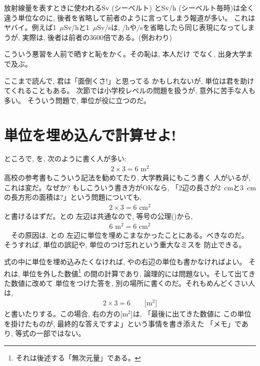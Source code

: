 \begin{exmpl} 放射線量を表すときに使われるSv (シーベルト)
とSv/h (シーベルト毎時)は全く違う単位なのに, 
後者を省略して前者のように言ってしまう報道が多い。
これはヤバイ。例えば1~$\mu$Sv/hと1~$\mu$Sv/sは, 
/hや/sを省略したら同じ表現になってしまうが, 実際は, 
後者は前者の3600倍である。(例おわり)\end{exmpl}\mv

こういう悪習を人前で晒すと恥をかく。その恥は, 本人だけ
でなく, 出身大学まで及ぶ。

ここまで読んで, 君は「面倒くさ!」と思ってる
かもしれないが, 単位は君を助けてくれることもある。
次節では小学校レベルの問題を扱うが, 意外に苦手な人も多い。
そういう問題で, 単位が役に立つのだ。\\

\section{単位を埋め込んで計算せよ!}
ところで, を, 次のように書く人が多い:
\begin{eqnarray}
2\times3=6\text{  m}^2\label{eq:rect_area00_NG}
\end{eqnarray}
高校の参考書もこういう記法を勧めてたり, 大学教員にもこう書く
人がいるが, これは変だ。なぜか? もしこういう書き方がOKなら, 
「2辺の長さが2~cmと3~cmの長方形の面積は?」という問題についても, 
\begin{eqnarray}
2\times3=6\text{  cm}^2\label{eq:rect_area00_NG2}
\end{eqnarray}
と書けるはずだ。との
左辺は共通なので, 等号の公理()から, 
\begin{eqnarray}
6\text{  m}^2=6\text{  cm}^2\label{eq:rect_area00_NG3}
\end{eqnarray}
　その原因は, 
との
左辺に単位を埋めこまなかったことにある。べきなのだ。
そうすれば, 単位の誤記や, 単位のつけ忘れという重大なミスを
防止できる。\mv

式の中に単位を埋め込みたくなければ, 
やの右辺の単位も書かなければよい。
それは, 単位を外した数値\footnote{それは後述する「無次元量」である。}
の間の計算であり, 論理的には問題ない。そして出てきた数値に改めて
単位をつけた答を, 別の場所に書くのだ。それもめんどくさい人は, 
\begin{eqnarray}
2\times3=6\quad\quad\text{[m$^2$]}\label{eq:rect_area00_NG5}
\end{eqnarray}
と書いたりする。この場合, 右の方の[m$^2$]は, 「最後に出てきた数値に
この単位を掛けたものが, 最終的な答えですよ」という事情を書き添えた
「メモ」であり, 等式の一部ではない。

